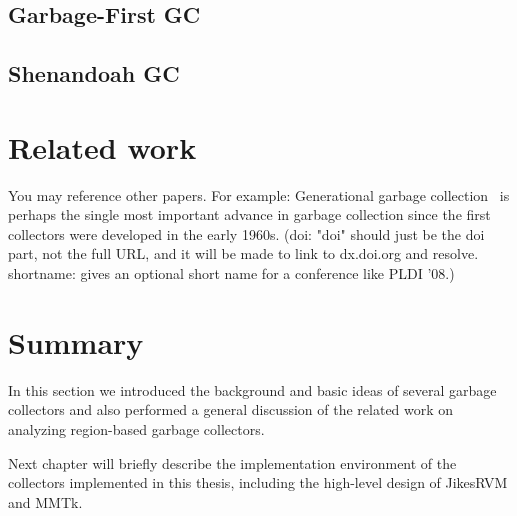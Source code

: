 \subsection{Garbage-First GC}

\subsection{Shenandoah GC}



\section{Related work}
\label{sec:relatedwork}
You may reference other papers. For example: 
Generational garbage collection~\citep{LH:83,Moon:84,Ungar:84} is perhaps the
single most important advance in garbage collection since the first collectors
were developed in the early 1960s. (doi: "doi" should just be the doi part, not
the full URL, and it will be made to link to dx.doi.org and resolve.
shortname: gives an optional short name for a conference like PLDI '08.)



\section{Summary}

In this section we introduced the background and basic ideas of several garbage collectors and
also performed a general discussion of the related work on analyzing region-based garbage collectors.

Next chapter will briefly describe the implementation environment of the collectors implemented
in this thesis, including the high-level design of JikesRVM and MMTk.
